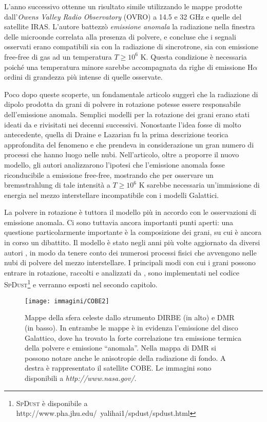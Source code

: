 L'anno successivo \textcite{L97} ottenne un risultato simile utilizzando le mappe prodotte dall'\textit{Owens Valley Radio Observatory} (OVRO) a 14.5 e 32 GHz e quelle del satellite IRAS. L'autore battezzò \textit{emissione anomala} la radiazione nella finestra delle microonde correlata alla presenza di polvere, e concluse che i segnali osservati erano compatibili sia con la radiazione di sincrotrone, sia con emissione free-free di gas ad un temperatura $T\geqslant10^6$ K. Questa condizione è necessaria poiché una temperatura minore sarebbe accompagnata da righe di emissione H$\alpha$ ordini di grandezza più intense di quelle osservate.

Poco dopo queste scoperte, un fondamentale articolo \parencite{DL98a} suggerì che la radiazione di dipolo prodotta da grani di polvere in rotazione potesse essere responsabile dell'emissione anomala. Semplici modelli per la rotazione dei grani erano stati ideati da \textcite{Erickson} e rivisitati nei decenni successivi. Nonostante l'idea fosse di molto antecedente, quella di Draine e Lazarian fu la prima descrizione teorica approfondita del fenomeno e che prendeva in considerazione un gran numero di processi che hanno luogo nelle nubi. Nell'articolo, oltre a proporre il nuovo modello, gli autori analizzarono l'ipotesi che l'emissione anomala fosse riconducibile a emissione free-free, mostrando che per osservare un bremsstrahlung di tale intensità a $T\geqslant10^6$ K sarebbe necessaria un'immissione di energia nel mezzo interstellare incompatibile con i modelli Galattici.

La polvere in rotazione è tuttora il modello più in accordo con le osservazioni di emissione anomala. Ci sono tuttavia ancora importanti punti aperti: una questione particolarmente importante è la composizione dei grani, su cui è ancora in corso un dibattito. Il modello è stato negli anni più volte aggiornato da diversi autori \parencite[vedi][]{Ali2}, in modo da tenere conto dei numerosi processi fisici che avvengono nelle nubi di polvere del mezzo interstellare. I principali modi con cui i grani possono entrare in rotazione, raccolti e analizzati da \textcite{Ali}, sono implementati nel codice \textsc{SpDust}\footnote{\textsc{SpDust} è disponibile a http://www.pha.jhu.edu/~yalihai1/spdust/spdust.html} e verranno esposti nel secondo capitolo.

\begin{figure}
\centering
\texttt{[image: immagini/COBE2]}
\caption{Mappe della sfera celeste dallo strumento DIRBE (in alto) e DMR (in basso). In entrambe le mappe è in evidenza l'emissione del disco Galattico, dove \textcite{K96} ha trovato la forte correlazione tra emissione termica della polvere e emissione ``anomala''. Nella mappa di DMR si possono notare anche le anisotropie della radiazione di fondo. A destra è rappresentato il satellite COBE. Le immagini sono disponibili a \textit{http://www.nasa.gov/}.}
\label{fig:DMR}
\end{figure}

